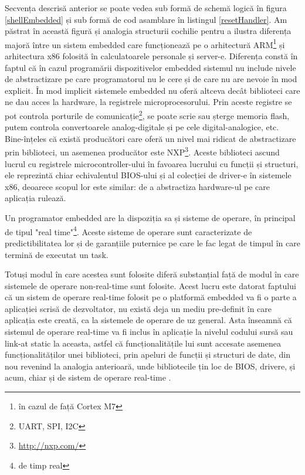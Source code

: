 \documentclass[12pt,a4paper,titlepage]{report}
\begin{document}
Secvența descrisă anterior se poate vedea sub formă de schemă logică în figura \ref{shellEmbedded} și sub formă de cod asamblare în listingul \ref{resetHandler}.
Am păstrat în această figură și analogia structurii cochilie pentru a ilustra diferența majoră între un sistem embedded care funcționează pe o arhitectură ARM\footnote{în cazul de față Cortex M7} și arhitectura x86 folosită în calculatoarele personale și server-e. Diferența constă în faptul că în cazul programării dispozitivelor embedded sistemul nu include nivele de abstractizare pe care programatorul nu le cere și de care nu are nevoie în mod explicit. În mod implicit sistemele embedded nu oferă altceva decât biblioteci care ne dau acces la hardware, la registrele microprocesorului. Prin aceste registre se pot controla porturile de comunicație\footnote{UART, SPI, I2C}, se poate scrie sau șterge memoria flash, putem controla convertoarele analog-digitale și pe cele digital-analogice, etc. Bine-înțeles că există producători care oferă un nivel mai ridicat de abstractizare prin biblioteci, un asemenea producător este NXP\footnote{\url{http://nxp.com/}}. Aceste biblioteci ascund lucrul cu registrele microcontroller-ului în favoarea lucrului cu funcții și structuri\cite{ksdk}, ele reprezintă chiar echivalentul BIOS-ului și al colecției de driver-e în sistemele x86, deoarece scopul lor este similar: de a abstractiza hardware-ul pe care aplicația rulează.

Un programator embedded are la dispoziția sa și sisteme de operare, în principal de tipul "real time"\footnote{de timp real}.
Aceste sisteme de operare sunt caracterizate de predictibilitatea lor și de garanțiile puternice pe care le fac legat de timpul în care termină de executat un task\cite{silberschatz}.

Totuși modul în care acestea sunt folosite diferă substanțial față de modul în care sistemele de operare non-real-time sunt folosite. Acest lucru este datorat faptului că un sistem de operare real-time folosit pe o platformă embedded va fi o parte a aplicației scrisă de dezvoltator, nu există deja un mediu pre-definit în care aplicația este creată, ca la sistemele de operare de uz general. Asta înseamnă că sistemul de operare real-time va fi inclus în aplicație la nivelul codului sursă sau link-at static la aceasta, astfel că funcționalitățile lui sunt accesate asemenea funcționalităților unei biblioteci, prin apeluri de funcții și structuri de date, din nou revenind la analogia anterioară, unde bibliotecile țin loc de BIOS, drivere, și acum, chiar și de sistem de operare real-time \cite{freertos}. 
\end{document}
